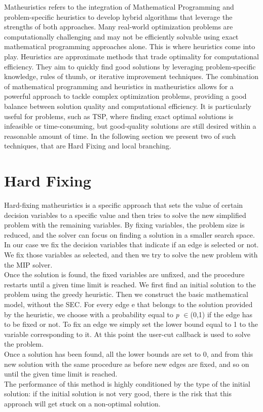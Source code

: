 Matheuristics refers to the integration of Mathematical Programming and problem-specific heuristics to develop hybrid algorithms that leverage the strengths of both approaches. Many real-world optimization problems are computationally challenging and may not be efficiently solvable using exact mathematical programming approaches alone. This is where heuristics come into play. Heuristics are approximate methods that trade optimality for computational efficiency. They aim to quickly find good solutions by leveraging problem-specific knowledge, rules of thumb, or iterative improvement techniques.
The combination of mathematical programming and heuristics in matheuristics allows for a powerful approach to tackle complex optimization problems, providing a good balance between solution quality and computational efficiency. It is particularly useful for problems, such as TSP, where finding exact optimal solutions is infeasible or time-consuming, but good-quality solutions are still desired within a reasonable amount of time.
In the following section we present two of such techniques, that are Hard Fixing and local branching.

\section{Hard Fixing}
Hard-fixing matheuristics is a specific approach that sets the value of certain decision variables to a specific value and then tries to solve the new simplified problem with the remaining variables. By fixing variables, the problem size is reduced, and the solver can focus on finding a solution in a smaller search space.\\
In our case we fix the decision variables that indicate if an edge is selected or not. We fix those variables as selected, and then we try to solve the new problem with the MIP solver.\\
Once the solution is found, the fixed variables are unfixed, and the procedure restarts until a given time limit is reached.
We first find an initial solution to the problem using the greedy heuristic. Then we construct the basic mathematical model, without the SEC. For every edge e that belongs to the solution provided by the heuristic, we choose with a probability equal to \textit{p} $\in$(0,1) if the edge has to be fixed or not. To fix an edge we simply set the lower bound equal to 1 to the variable corresponding to it. At this point the user-cut callback is used to solve the problem.\\ 
Once a solution has been found, all the lower bounds are set to 0, and from this new solution with the same procedure as before new edges are fixed, and so on until the given time limit is reached.\\
The performance of this method is highly conditioned by the type of the initial solution: if the initial solution is not very good, there is the risk that this approach will get stuck on a non-optimal solution.


